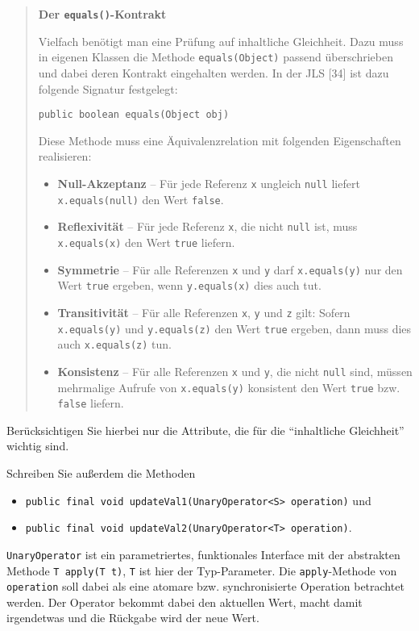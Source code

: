 \documentclass[11pt]{article} %
\begin{document}
\blockquote{
\textbf{Der \texttt{equals()}-Kontrakt}\par
Vielfach benötigt man eine Prüfung auf inhaltliche Gleichheit. Dazu muss in eigenen
Klassen die Methode \texttt{equals(Object)} passend überschrieben und dabei deren Kontrakt
eingehalten werden. In der JLS [34] ist dazu folgende Signatur festgelegt:\par
\leavevmode{\parindent=1em\indent} \texttt{public boolean equals(Object obj)}\par
Diese Methode muss eine Äquivalenzrelation mit folgenden Eigenschaften realisieren:
\begin{itemize}
\item \textbf{Null-Akzeptanz} – Für jede Referenz \texttt{x} ungleich \texttt{null} liefert \texttt{x.equals(null)}
den Wert \texttt{false}.
\item \textbf{Reflexivität} – Für jede Referenz \texttt{x}, die nicht \texttt{null} ist, muss \texttt{x.equals(x)} den
Wert \texttt{true} liefern.
\item \textbf{Symmetrie} – Für alle Referenzen \texttt{x} und \texttt{y} darf \texttt{x.equals(y)} nur den Wert \texttt{true}
ergeben, wenn \texttt{y.equals(x)} dies auch tut.
\item \textbf{Transitivität} – Für alle Referenzen \texttt{x}, \texttt{y} und \texttt{z} gilt: Sofern \texttt{x.equals(y)} und
\texttt{y.equals(z)} den Wert \texttt{true} ergeben, dann muss dies auch \texttt{x.equals(z)} tun.
\item \textbf{Konsistenz} – Für alle Referenzen \texttt{x} und \texttt{y}, die nicht \texttt{null} sind, müssen mehrmalige
Aufrufe von \texttt{x.equals(y)} konsistent den Wert \texttt{true} bzw. \texttt{false} liefern.
\end{itemize}
}

Berücksichtigen Sie hierbei nur die Attribute, die für die ``inhaltliche Gleichheit'' wichtig sind.\par
Schreiben Sie außerdem die Methoden
\begin{itemize}
\item \texttt{public final void updateVal1(UnaryOperator<S> operation)} und
\item \texttt{public final void updateVal2(UnaryOperator<T> operation)}.
\end{itemize}
\texttt{UnaryOperator} ist ein parametriertes, funktionales Interface mit der abstrakten Methode \newline\texttt{T apply(T t)}, \texttt{T} ist hier der Typ-Parameter. Die \texttt{apply}-Methode von \texttt{operation} soll dabei als eine atomare bzw. synchronisierte Operation betrachtet werden. Der Operator bekommt dabei den aktuellen Wert, macht damit irgendetwas und die Rückgabe wird der neue Wert.
\end{document}
